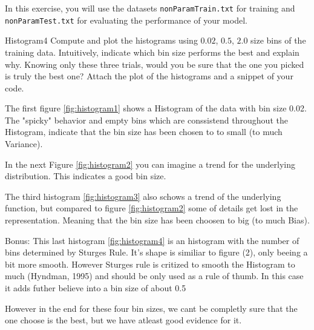 \newif\ifvimbug
\vimbugfalse

\ifvimbug

\fi

 
In this exercise, you will use the datasets \texttt{nonParamTrain.txt} for training and \texttt{nonParamTest.txt} for evaluating the performance of your model.

\begin{questions}


\begin{question}{Histogram}{4}
Compute and plot the histograms using $0.02$, $0.5$, $2.0$ size bins of the training data.  
Intuitively, indicate which bin size performs the best and explain why. Knowing only these three trials, would you be sure that the one you picked is truly the best one? Attach the plot of the histograms and a snippet of your code.

\begin{answer}
The first figure \ref{fig:histogram1} shows a Histogram of the data with bin size 0.02. The "spicky" behavior and empty bins which are conssistend throughout the Histogram, indicate that the bin size has been chosen to to small (to much Variance).	

In the next Figure \ref{fig:histogram2} you can imagine a trend for the underlying distribution. This indicates a good bin size.


The third histogram \ref{fig:histogram3} also schows a trend of the underlying function, but compared to figure \ref{fig:histogram2} some of details get lost in the representation. Meaning that the bin size has been choosen to big (to much Bias).

Bonus: This last histogram \ref{fig:histogram4} is an histogram with the number of bins determined by Sturges Rule. It's shape is similiar to figure (2), only beeing a bit more smooth. However Sturges rule is critized to smooth the Histogram to much (Hyndman, 1995) and should be only used as a rule of thumb. In this case it adds futher believe into a bin size of about 0.5

However in the end for these four bin sizes, we cant be completly sure that the one choose is the best, but we have atleast good evidence for it.
	
\end{answer}
\end{question}



\end{questions}
